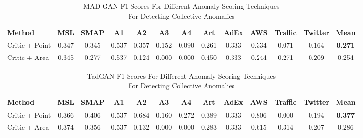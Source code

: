 \begin{table}[H]
\centering
\scriptsize
\begin{tabular}{lccccccccccc | c}
\toprule
Method & MSL & SMAP & A1 & A2 & A3 & A4 & Art & AdEx & AWS & Traffic & Twitter & Mean \\
\midrule
Critic + Point   & 0.347 & 0.345 & 0.537 & 0.357 & 0.152 & 0.090 & 0.261 & 0.333 & 0.334 & 0.071 & 0.164 & \textbf{0.271}  \\
Critic + Area    & 0.345 & 0.277 & 0.537 & 0.124 & 0.000 & 0.000 & 0.450 & 0.333 & 0.244 & 0.271 & 0.209 & 0.254 \\
\bottomrule
\end{tabular}
\caption{\centering MAD-GAN F1-Scores For Different Anomaly Scoring Techniques \\ For Detecting Collective Anomalies}
\label{tab:f1-scores-mad-gan-variations}
\end{table}


\begin{table}[H]
\centering
\scriptsize
\begin{tabular}{lccccccccccc | c}
\toprule
Method & MSL & SMAP & A1 & A2 & A3 & A4 & Art & AdEx & AWS & Traffic & Twitter & Mean\\
\midrule
Critic + Point   & 0.366 & 0.406 & 0.537 & 0.684 & 0.160 & 0.272 & 0.389 & 0.333 & 0.806 & 0.000 & 0.194 & \textbf{0.377} \\
Critic + Area    & 0.374 & 0.356 & 0.537 & 0.132 & 0.000 & 0.000 & 0.283 & 0.333 & 0.615 & 0.314 & 0.207 & 0.286 \\
\bottomrule
\end{tabular}
\caption{\centering TadGAN F1-Scores For Different Anomaly Scoring Techniques \\ For Detecting Collective Anomalies}
\label{tab:f1-scores-tad-gan-variations}
\end{table}
